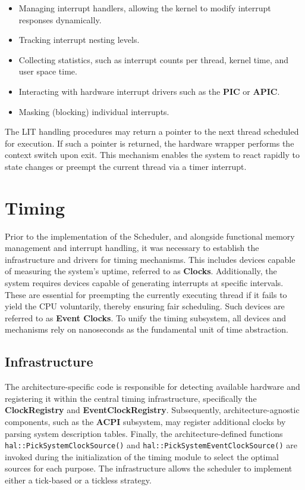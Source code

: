 \documentclass[a4paper,10pt,twoside]{report}
\theoremstyle{definition}
\begin{document}
\begin{itemize}
\item Managing interrupt handlers, allowing the kernel to modify interrupt responses dynamically.
\item Tracking interrupt nesting levels.
\item Collecting statistics, such as interrupt counts per thread, kernel time, and user space time.
\item Interacting with hardware interrupt drivers such as the \textbf{PIC} or \textbf{APIC}.
\item Masking (blocking) individual interrupts.
\end{itemize}

The LIT handling procedures may return a pointer to the next thread scheduled for execution. If such a pointer is returned, the hardware wrapper performs the context switch upon exit. This mechanism enables the system to react rapidly to state changes or preempt the current thread via a timer interrupt.
\section{Timing}
\label{sec:timing}

Prior to the implementation of the Scheduler, and alongside functional memory management and interrupt handling, it was necessary to establish the infrastructure and drivers for timing mechanisms. This includes devices capable of measuring the system's uptime, referred to as \textbf{Clocks}. Additionally, the system requires devices capable of generating interrupts at specific intervals. These are essential for preempting the currently executing thread if it fails to yield the CPU voluntarily, thereby ensuring fair scheduling. Such devices are referred to as \textbf{Event Clocks}. To unify the timing subsystem, all devices and mechanisms rely on nanoseconds as the fundamental unit of time abstraction.

\subsection{Infrastructure}

The architecture-specific code is responsible for detecting available hardware and registering it within the central timing infrastructure, specifically the \textbf{ClockRegistry} and \textbf{EventClockRegistry}. Subsequently, architecture-agnostic components, such as the \textbf{ACPI} subsystem, may register additional clocks by parsing system description tables. Finally, the architecture-defined functions \texttt{hal::PickSystemClockSource()} and \texttt{hal::PickSystemEventClockSource()} are invoked during the initialization of the timing module to select the optimal sources for each purpose. The infrastructure allows the scheduler to implement either a tick-based or a tickless strategy.
\end{document}
